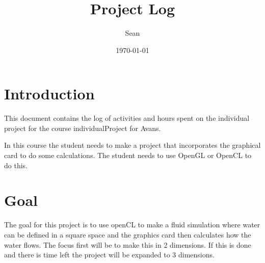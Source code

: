 \documentclass{article}
\title{Project Log}
\author{Sean}
\date{\today}
\begin{document}
\maketitle

\section*{Introduction}
This document contains the log of activities and hours spent on the individual project for the course individualProject for Avans.

In this course the student needs to make a project that incorporates the graphical card to do some calculations. The student needs to use OpenGL or OpenCL to do this.

\section*{Goal}
The goal for this project is to use openCL to make a fluid simulation where water can be defined in a square space and the graphics card then calculates how the water flows.
The focus first will be to make this in 2 dimensions. If this is done and there is time left the project will be expanded to 3 dimensions.

\newpage
\end{document}
